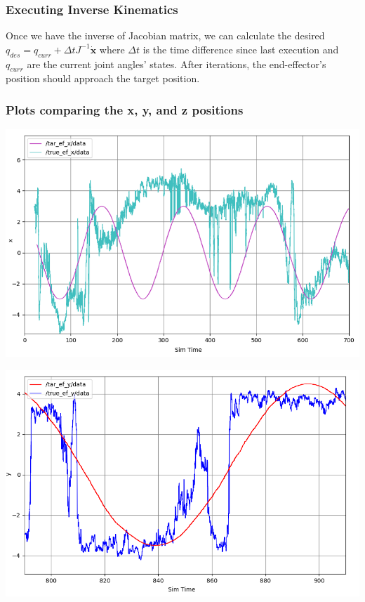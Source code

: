 \documentclass[11pt]{article}
\begin{document}
\subsubsection{Executing Inverse Kinematics}

Once we have the inverse of Jacobian matrix, we can calculate the desired $q_{des}=q_{curr}+\Delta t J^{-1}\mathbf{\dot{x}}$ where $\Delta t$ is the time difference since last execution and $q_{curr}$ are the current joint angles' states. After iterations, the end-effector's position should approach the target position.

\subsubsection{Plots comparing the x, y, and z positions}

\begin{center}
\begin{minipage}{0.5\linewidth}
\includegraphics[width=\linewidth]{fig_with_axisname/ikx2.png}
\end{minipage}%
\hfill
\begin{minipage}{0.5\linewidth}
\includegraphics[width=\linewidth]{fig_with_axisname/iky2.png}
\end{minipage}
\end{center}
\end{document}

